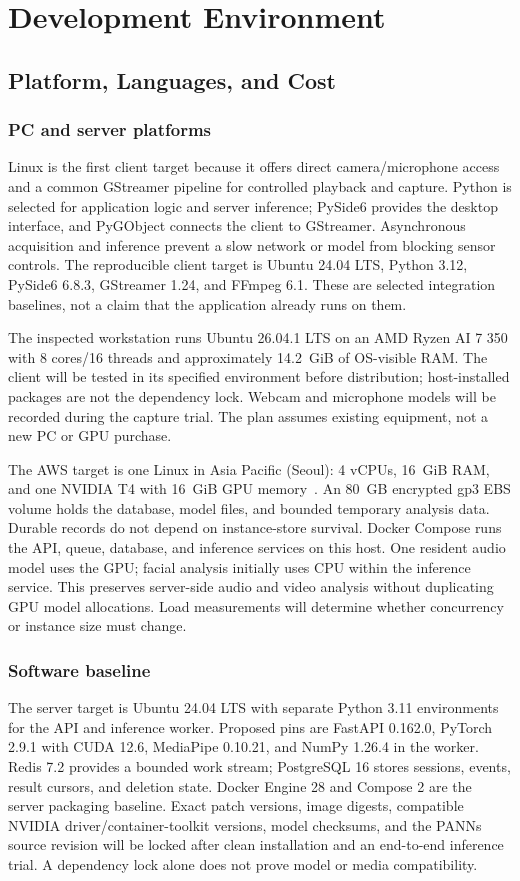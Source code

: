 \section{Development Environment}
\subsection{Platform, Languages, and Cost}
\subsubsection{PC and server platforms}
Linux is the first client target because it offers direct camera/microphone access and a common GStreamer pipeline for controlled playback and capture. Python is selected for application logic and server inference; PySide6 provides the desktop interface, and PyGObject connects the client to GStreamer. Asynchronous acquisition and inference prevent a slow network or model from blocking sensor controls. The reproducible client target is Ubuntu 24.04 LTS, Python 3.12, PySide6 6.8.3, GStreamer 1.24, and FFmpeg 6.1. These are selected integration baselines, not a claim that the application already runs on them.

The inspected workstation runs Ubuntu 26.04.1 LTS on an AMD Ryzen AI 7 350 with 8 cores/16 threads and approximately 14.2~GiB of OS-visible RAM. The client will be tested in its specified environment before distribution; host-installed packages are not the dependency lock. Webcam and microphone models will be recorded during the capture trial. The plan assumes existing equipment, not a new PC or GPU purchase.

The AWS target is one Linux  in Asia Pacific (Seoul): 4 vCPUs, 16~GiB RAM, and one NVIDIA T4 with 16~GiB GPU memory~\cite{ec2spec}. An 80~GB encrypted gp3 EBS volume holds the database, model files, and bounded temporary analysis data. Durable records do not depend on instance-store survival. Docker Compose runs the API, queue, database, and inference services on this host. One resident audio model uses the GPU; facial analysis initially uses CPU within the inference service. This preserves server-side audio and video analysis without duplicating GPU model allocations. Load measurements will determine whether concurrency or instance size must change.

\subsubsection{Software baseline}
The server target is Ubuntu 24.04 LTS with separate Python 3.11 environments for the API and inference worker. Proposed pins are FastAPI 0.162.0, PyTorch 2.9.1 with CUDA 12.6, MediaPipe 0.10.21, and NumPy 1.26.4 in the worker. Redis 7.2 provides a bounded work stream; PostgreSQL 16 stores sessions, events, result cursors, and deletion state. Docker Engine 28 and Compose 2 are the server packaging baseline. Exact patch versions, image digests, compatible NVIDIA driver/container-toolkit versions, model checksums, and the PANNs source revision will be locked after clean installation and an end-to-end inference trial. A dependency lock alone does not prove model or media compatibility.


